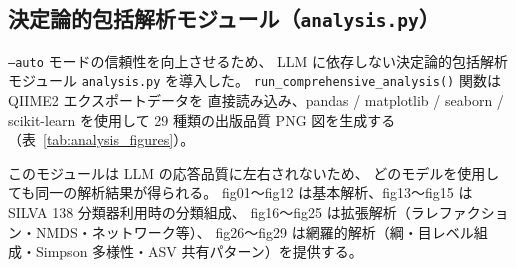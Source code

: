 \documentclass[12pt, a4paper]{article}
\begin{document}
\subsection{決定論的包括解析モジュール（\texttt{analysis.py}）}

\texttt{--auto} モードの信頼性を向上させるため、
LLM に依存しない決定論的包括解析モジュール \texttt{analysis.py} を導入した。
\texttt{run\_comprehensive\_analysis()} 関数は QIIME2 エクスポートデータを
直接読み込み、pandas / matplotlib / seaborn / scikit-learn を使用して
29 種類の出版品質 PNG 図を生成する（表~\ref{tab:analysis_figures}）。

このモジュールは LLM の応答品質に左右されないため、
どのモデルを使用しても同一の解析結果が得られる。
fig01〜fig12 は基本解析、fig13〜fig15 は SILVA 138 分類器利用時の分類組成、
fig16〜fig25 は拡張解析（ラレファクション・NMDS・ネットワーク等）、
fig26〜fig29 は網羅的解析（綱・目レベル組成・Simpson 多様性・ASV 共有パターン）を提供する。
\end{document}
